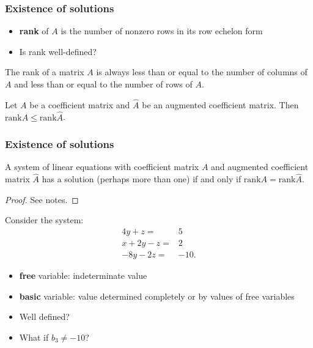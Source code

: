 \documentclass[compress]{beamer}
\newcommand{\rank}{\mathrm{rank}}
\begin{document}
\begin{frame}
  \frametitle{Existence of solutions}
  \begin{itemize}
  \item \textbf{rank} of $A$ is the number of nonzero rows in its row
    echelon form
  \item Is rank well-defined?
  \end{itemize}
  
  \begin{lemma}\label{lem:rankcr}
    The rank of a matrix $A$ is always less than or equal to the number
    of columns of $A$ and less than or equal to the number of rows of $A$.
  \end{lemma}
  
  \begin{lemma}\label{lem:rankaug}
    Let $A$ be a coefficient matrix and $\hat{A}$ be an augmented
    coefficient matrix. Then $\rank A \leq \rank \hat{A}$.
  \end{lemma}
\end{frame}


\begin{frame}
  \frametitle{Existence of solutions}
  \begin{theorem}\label{thm:exist}
    A system of linear equations with coefficient matrix $A$ and
    augmented coefficient matrix $\hat{A}$ has a solution (perhaps more
    than one) if and only if $\rank A = \rank \hat{A}$.
  \end{theorem}
  \begin{proof}
    See notes.
  \end{proof}
\end{frame}

\begin{frame}
  Consider the system:
  \begin{align*}
    4 y + z = & 5 \\    
    x + 2 y - z = & 2 \\
    -8y - 2z = & -10.
  \end{align*}
  \begin{itemize}
  \item \textbf{free} variable: indeterminate value
  \item \textbf{basic} variable: value determined completely or by
    values of free variables
  \item Well defined?
  \item What if $b_3 \neq -10$?
  \end{itemize}  
\end{frame}
\end{document}
